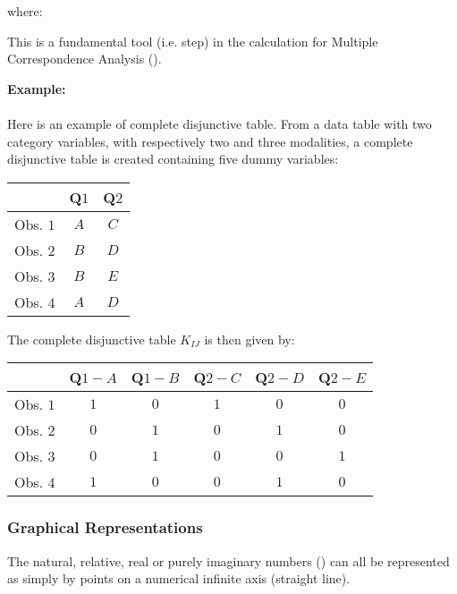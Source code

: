  	where:
 	
	This is a fundamental tool (i.e. step) in the calculation for Multiple Correspondence Analysis ().
	
	\begin{tcolorbox}[colframe=black,colback=white,sharp corners]
	\textbf{{\Large {}}Example:}\\\\
	Here is an example of complete disjunctive table. From a data table with two category variables, with respectively two and three modalities, a complete disjunctive table is created containing five dummy variables:
	\begin{table}[H]
		\centering
		\begin{tabular}{|c|c|c|}
		\hline 
		\rowcolor[gray]{0.75}& Q$1$ & Q$2$ \\
		\hline Obs. $1$ & $A$ & $C$ \\
		\hline Obs. $2$ & $B$ & $D$ \\
		\hline Obs. $3$ & $B$ & $E$ \\
		\hline Obs. $4$ & $A$ & $D$ \\
		\hline
		\end{tabular}
	\end{table}
	The complete disjunctive table $K_{IJ}$ is then given by:
	\begin{table}[H]
		\centering
		\begin{tabular}{|l|c|c|c|c|c|}
		\hline 
		\rowcolor[gray]{0.75}& Q${1-{A}}$ & Q$1-B$ & Q$2-C$ & Q$2-D$ & Q$2-E$ \\
		\hline Obs. $1$ & $1$ & $0$ & $1$ & $0$ & $0$ \\
		\hline Obs. $2$ & $0$ & $1$ & $0$ & $1$ & $0$ \\
		\hline Obs. $3$ & $0$ & $1$ & $0$ & $0$ & $1$ \\
		\hline Obs. $4$ & $1$ & $0$ & $0$ & $1$ & $0$ \\
		\hline
		\end{tabular}
	\end{table}
	\end{tcolorbox}
	
	\pagebreak
	\subsubsection{Graphical Representations}
	The natural, relative, real or purely imaginary numbers () can all be represented as simply by points on a numerical infinite axis (straight line).

